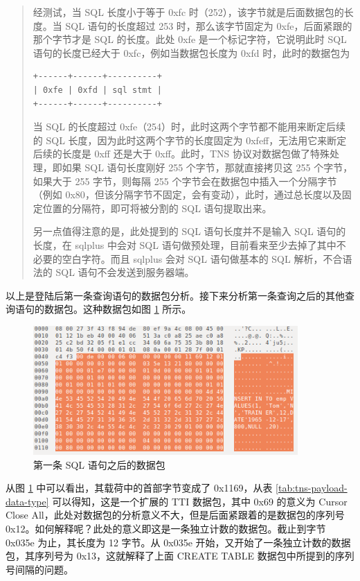 \begin{quote}
    经测试，当 SQL 长度小于等于 {\cf 0xfc} 时（252），该字节就是后面数据包的长度。当 SQL 语句的长度超过 253 时，那么该字节固定为 {\cf 0xfe}，后面紧跟的那个字节才是 SQL 的长度。此处 {\cf 0xfe} 是一个标记字符，它说明此时 SQL 语句的长度已经大于 {\cf 0xfc}，例如当数据包长度为 {\cf 0xfd} 时，此时的数据包为

\begin{lstlisting}
+------+------+----------+
| 0xfe | 0xfd | sql stmt |
+------+------+----------+
\end{lstlisting}

当 SQL 的长度超过 {\cf 0xfe}（254）时，此时这两个字节都不能用来断定后续的 SQL 长度，因为此时这两个字节的长度固定为 {\cf 0xfeff}，无法用它来断定后续的长度是 {\cf 0xff} 还是大于 {\cf 0xff}。此时，TNS 协议对数据包做了特殊处理，即如果 SQL 语句长度刚好 255 个字节，那就直接拷贝这 255 个字节，如果大于 255 字节，则每隔 255 个字节会在数据包中插入一个分隔字节（例如 {\cf 0x80}，但该分隔字节不固定，会有变动），此时，通过总长度以及固定位置的分隔符，即可将被分割的 SQL 语句提取出来。

另一点值得注意的是，此处提到的 SQL 语句长度并不是输入 SQL 语句的长度，在 sqlplus 中会对 SQL 语句做预处理，目前看来至少去掉了其中不必要的空白字符。而且 sqlplus 会对 SQL 语句做基本的 SQL 解析，不合语法的 SQL 语句不会发送到服务器端。
\end{quote}

以上是登陆后第一条查询语句的数据包分析。接下来分析第一条查询之后的其他查询语句的数据包。这种数据包如图 \ref{fig:tns-successive-sql} 所示。

\begin{figure}[ht!]
    \caption{第一条 SQL 语句之后的数据包}
    \label{fig:tns-successive-sql}
    \centering
    \includegraphics[width=0.9\textwidth]{tns-successive-sql.png}
\end{figure}

从图 \ref{fig:tns-successive-sql} 中可以看出，其载荷中的首部字节变成了 {\cf 0x1169}，从表 \ref{tab:tns-payload-data-type} 可以得知，这是一个扩展的 TTI 数据包，其中 {\cf 0x69} 的意义为 {\ef Cursor Close All}，此处对数据包的分析意义不大，但是后面紧跟着的是数据包的序列号 {\cf 0x12}。如何解释呢？此处的意义即这是一条独立计数的数据包。截止到字节 {\cf 0x035e} 为止，其长度为 12 字节。从 {\cf 0x035e} 开始，又开始了一条独立计数的数据包，其序列号为 {\cf 0x13}，这就解释了上面 {\cf CREATE TABLE} 数据包中所提到的序列号间隔的问题。

